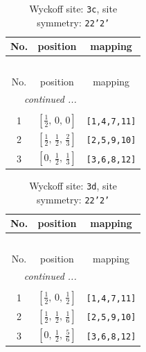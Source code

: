\documentclass[fleqn,8pt]{jsarticle}
\begin{document}
\renewcommand{\arraystretch}{1.2}
\begin{longtable}{ccc}
\caption{Wyckoff site: {\tt 3c}, site symmetry: {\tt 22'2'}}
 \\
 \hline \hline
No. & position & mapping \\ \hline \endfirsthead

\multicolumn{2}{l}{\tablename\ \thetable{}} \\
 \hline \hline
No. & position & mapping \\ \hline \endhead

 \hline \hline
\multicolumn{2}{r}{\footnotesize\it continued ...} \\ \endfoot

 \hline \hline
\multicolumn{2}{r}{} \\ \endlastfoot

1 & $\left[ \frac{1}{2},\, 0,\, 0 \right]$ & {\tt [1,4,7,11]} \\ \hline
2 & $\left[ \frac{1}{2},\, \frac{1}{2},\, \frac{2}{3} \right]$ & {\tt [2,5,9,10]} \\ \hline
3 & $\left[ 0,\, \frac{1}{2},\, \frac{1}{3} \right]$ & {\tt [3,6,8,12]} \\
\end{longtable}
\renewcommand{\arraystretch}{1.2}
\begin{longtable}{ccc}
\caption{Wyckoff site: {\tt 3d}, site symmetry: {\tt 22'2'}}
 \\
 \hline \hline
No. & position & mapping \\ \hline \endfirsthead

\multicolumn{2}{l}{\tablename\ \thetable{}} \\
 \hline \hline
No. & position & mapping \\ \hline \endhead

 \hline \hline
\multicolumn{2}{r}{\footnotesize\it continued ...} \\ \endfoot

 \hline \hline
\multicolumn{2}{r}{} \\ \endlastfoot

1 & $\left[ \frac{1}{2},\, 0,\, \frac{1}{2} \right]$ & {\tt [1,4,7,11]} \\ \hline
2 & $\left[ \frac{1}{2},\, \frac{1}{2},\, \frac{1}{6} \right]$ & {\tt [2,5,9,10]} \\ \hline
3 & $\left[ 0,\, \frac{1}{2},\, \frac{5}{6} \right]$ & {\tt [3,6,8,12]} \\
\end{longtable}
\renewcommand{\arraystretch}{1.2}
\end{document}
